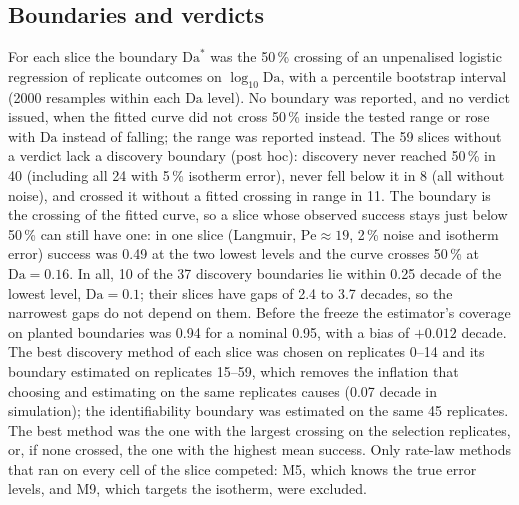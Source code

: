 \documentclass[11pt]{article}
\newcommand{\Da}{\mathrm{Da}}
\newcommand{\Pe}{\mathrm{Pe}}
\begin{document}
\subsection*{Boundaries and verdicts}
For each slice the boundary $\Da^{*}$ was the 50\,\% crossing of an unpenalised logistic
regression of replicate outcomes on $\log_{10}\Da$, with a percentile bootstrap interval
(2000 resamples within each $\Da$ level). No boundary was reported, and no verdict issued,
when the fitted curve did not cross 50\,\% inside the tested range or rose with $\Da$ instead
of falling; the range was reported instead. The 59 slices without a verdict lack a discovery boundary (post hoc): discovery never reached 50\,\%
in 40 (including all 24 with 5\,\% isotherm error), never fell below it in 8 (all without noise), and crossed it without a fitted crossing in range in 11. The boundary is the crossing of the fitted curve, so
a slice whose observed success stays just below 50\,\% can still have one: in one slice
(Langmuir, $\Pe \approx 19$, 2\,\% noise and isotherm error) success was 0.49 at the two lowest
levels and the curve crosses 50\,\% at $\Da = 0.16$. In all, 10 of the 37 discovery boundaries lie
within 0.25 decade of the lowest level, $\Da = 0.1$; their slices have gaps of 2.4 to 3.7
decades, so the narrowest gaps do not depend on them. Before the freeze the estimator's coverage on planted boundaries was 0.94 for a
nominal 0.95, with a bias of $+0.012$ decade. The best discovery method of each slice was
chosen on replicates 0--14 and its boundary estimated on replicates 15--59, which removes the
inflation that choosing and estimating on the same replicates causes (0.07 decade in
simulation); the identifiability boundary was estimated on the same 45 replicates. The best
method was the one with the largest crossing on the selection replicates, or, if none crossed,
the one with the highest mean success. Only rate-law methods that ran on every cell of the
slice competed: M5, which knows the true error levels, and M9, which targets the isotherm, were
excluded.
\end{document}
